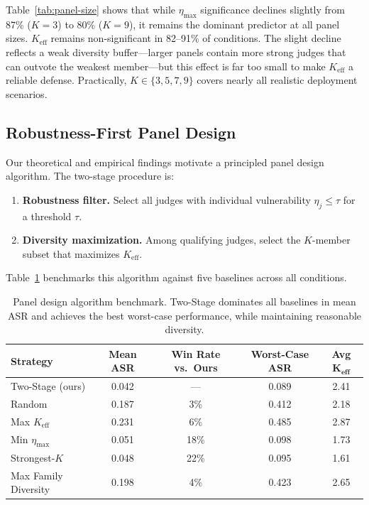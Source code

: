 \documentclass[11pt]{article}
\begin{document}
Table~\ref{tab:panel-size} shows that while $\eta_{\max}$ significance declines slightly from 87\% ($K=3$) to 80\% ($K=9$), it remains the dominant predictor at all panel sizes. $K_{\text{eff}}$ remains non-significant in 82--91\% of conditions. The slight decline reflects a weak diversity buffer---larger panels contain more strong judges that can outvote the weakest member---but this effect is far too small to make $K_{\text{eff}}$ a reliable defense. Practically, $K \in \{3, 5, 7, 9\}$ covers nearly all realistic deployment scenarios.

\subsection{Robustness-First Panel Design}
\label{sec:algorithm}

Our theoretical and empirical findings motivate a principled panel design algorithm. The two-stage procedure is:

\begin{enumerate}
    \item \textbf{Robustness filter.} Select all judges with individual vulnerability $\eta_j \leq \tau$ for a threshold $\tau$.
    \item \textbf{Diversity maximization.} Among qualifying judges, select the $K$-member subset that maximizes $K_{\text{eff}}$.
\end{enumerate}

Table~\ref{tab:algorithm} benchmarks this algorithm against five baselines across all conditions.

\begin{table}[t]
\centering
\caption{Panel design algorithm benchmark. Two-Stage dominates all baselines in mean ASR and achieves the best worst-case performance, while maintaining reasonable diversity.}
\label{tab:algorithm}
\small
\begin{tabular}{lcccc}
\toprule
\textbf{Strategy} & \textbf{Mean ASR} & \textbf{Win Rate vs.\ Ours} & \textbf{Worst-Case ASR} & \textbf{Avg} $\boldsymbol{K_{\text{eff}}}$ \\
\midrule
Two-Stage (ours)       & 0.042 & ---  & 0.089 & 2.41 \\
Random                 & 0.187 & 3\%  & 0.412 & 2.18 \\
Max $K_{\text{eff}}$   & 0.231 & 6\%  & 0.485 & 2.87 \\
Min $\eta_{\max}$      & 0.051 & 18\% & 0.098 & 1.73 \\
Strongest-$K$          & 0.048 & 22\% & 0.095 & 1.61 \\
Max Family Diversity   & 0.198 & 4\%  & 0.423 & 2.65 \\
\bottomrule
\end{tabular}
\end{table}
\end{document}
